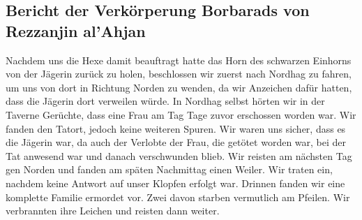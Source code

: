 \documentclass[11pt]{scrreprt}
\begin{document}
\subsection{Bericht der Verkörperung Borbarads von Rezzanjin al’Ahjan}
Nachdem uns die Hexe damit beauftragt hatte das Horn des schwarzen Einhorns von der Jägerin zurück zu holen, beschlossen wir zuerst nach Nordhag zu fahren, um uns von dort in Richtung Norden zu wenden, da wir Anzeichen dafür hatten, dass die Jägerin dort verweilen würde. In Nordhag selbst hörten wir in der Taverne Gerüchte, dass eine Frau am Tag Tage zuvor erschossen worden war. Wir fanden den Tatort, jedoch keine weiteren Spuren. Wir waren uns sicher, dass es die Jägerin war, da auch der Verlobte der Frau, die getötet worden war, bei der Tat anwesend war und danach verschwunden blieb. Wir reisten am nächsten Tag gen Norden und fanden am späten Nachmittag einen Weiler. Wir traten ein, nachdem keine Antwort auf unser Klopfen erfolgt war. Drinnen fanden wir eine komplette Familie ermordet vor. Zwei davon starben vermutlich am Pfeilen. Wir verbrannten ihre Leichen und reisten dann weiter. \par
\end{document}
